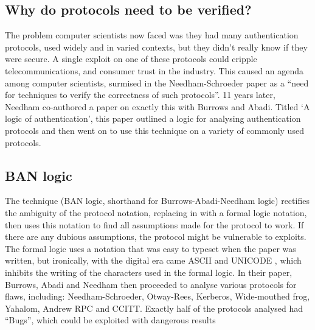 \documentclass{article}
\begin{document}
\subsection{Why do protocols need to be verified?}
The problem computer scientists now faced was they had many authentication
protocols, used widely and in varied contexts, but they didn’t really know if
they were secure. A single exploit on one of these protocols could cripple
telecommunications, and consumer trust in the industry. This caused an agenda
among computer scientists, surmised in the Needham-Schroeder paper as a “need
for techniques to verify the correctness of such protocols”. 11 years later,
Needham co-authored a paper on exactly this with Burrows and Abadi. Titled ‘A
logic of authentication’, this paper outlined a logic for analysing
authentication protocols and then went on to use this technique on a variety of
commonly used protocols.

\subsection{BAN logic}
The technique (BAN logic, shorthand for Burrows-Abadi-Needham logic) rectifies
the ambiguity of the protocol notation, replacing in with a formal logic
notation, then uses this notation to find all assumptions made for the protocol
to work. If there are any dubious assumptions, the protocol might be vulnerable
to exploits. The formal logic uses a notation that was easy to typeset  when the
paper was written, but ironically, with the digital era came ASCII  and UNICODE
, which inhibits the writing of the characters used in the formal logic. In
their paper, Burrows, Abadi and Needham then proceeded to analyse various
protocols for flaws, including: Needham-Schroeder, Otway-Rees, Kerberos,
Wide-mouthed frog, Yahalom, Andrew RPC and CCITT. Exactly half of the protocols
analysed had “Bugs”, which could be exploited with dangerous results
\end{document}
